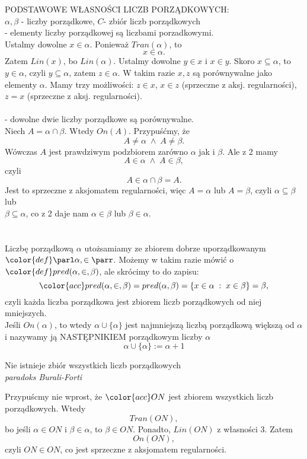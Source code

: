 {\large\color{def}PODSTAWOWE WŁASNOŚCI LICZB PORZĄDKOWYCH:}\medskip\\
$\alpha, \beta$ - liczby porządkowe, $C$- zbiór liczb porządkowych\medskip\\
 - elementy liczby porządkowej są liczbami porzadkowymi.\smallskip\\
Ustalmy dowolne $x\in\alpha.$ Ponieważ $Tran(\alpha)$, to
$$x\in\alpha.$$
Zatem $Lin(x)$, bo $Lin(\alpha)$. Ustalmy dowolne $y\in x$ i $x\in y$. Skoro $x\subseteq \alpha$, to $y\in\alpha$, czyli $y\subseteq \alpha$, zatem $z\in \alpha$. W takim razie $x, z$ są porównywalne jako elementy $\alpha$. Mamy trzy możliwości: $z\in x$, $x\in z$ (sprzeczne z aksj. regularności), $z=x$ (sprzeczne z aksj. regularności).\medskip\\
\medskip\\
 - dowolne dwie liczby porządkowe są porównywalne.\smallskip\\
Niech $A=\alpha\cap\beta$. Wtedy $On(A)$. Przypuśćmy, że
$$A\neq \alpha\;\land\;A\neq\beta.$$
Wówczas $A$ jest prawdziwym podzbiorem zarówno $\alpha$ jak i $\beta$. Ale z 2 mamy
$$A\in \alpha\;\land\;A\in\beta,$$
czyli
$$A\in \alpha\cap\beta=A.$$
Jest to sprzeczne z aksjomatem regularności, więc $A=\alpha$ lub $A=\beta$, czyli $\alpha\subseteq \beta$ lub \\$\beta\subseteq\alpha$, co z 2 daje nam $\alpha\in \beta$ lub $\beta\in\alpha$.\medskip\\
\medskip\\
\bigskip\\

Liczbę porządkową $\alpha$ utożsamiamy ze zbiorem dobrze uporządkowanym $\color{def}\parl \alpha, \in\parr$. Możemy w takim razie mówić o $\color{def}pred(\alpha,\in,\beta)$, ale skrócimy to do zapisu:
$$\color{acc}pred(\alpha,\in,\beta)=pred(\alpha,\beta)=\{x\in\alpha\;:\;x\in\beta\}=\beta,$$
czyli każda liczba porządkowa jest zbiorem liczb porządkowych od niej mniejszych.\bigskip\\
Jeśli $On(\alpha)$, to wtedy $\alpha\cup\{\alpha\}$ jest najmniejszą liczbą porządkową większą od $\alpha$ i nazywamy ją {\color{def}NASTĘPNIKIEM} porządkowym liczby $\alpha$
$$\alpha\cup\{\alpha\}:=\alpha+1$$
\begin{center}\large
    Nie istnieje zbiór wszystkich liczb porządkowych\medskip\\
    \normalsize\emph{paradoks Burali-Forti}
\end{center}
\dowod
Przypuścmy nie wprost, że $\color{acc}ON$ jest zbiorem wszystkich liczb porządkowych. Wtedy 
$$Tran(ON),$$ 
bo jeśli $\alpha\in ON$ i $\beta\in \alpha$, to $\beta\in ON$. Ponadto, $Lin(ON)$ z własności 3. Zatem 
$$On(ON),$$ 
czyli $ON\in ON$, co jest sprzeczne z aksjomatem regularności.
\kondow

